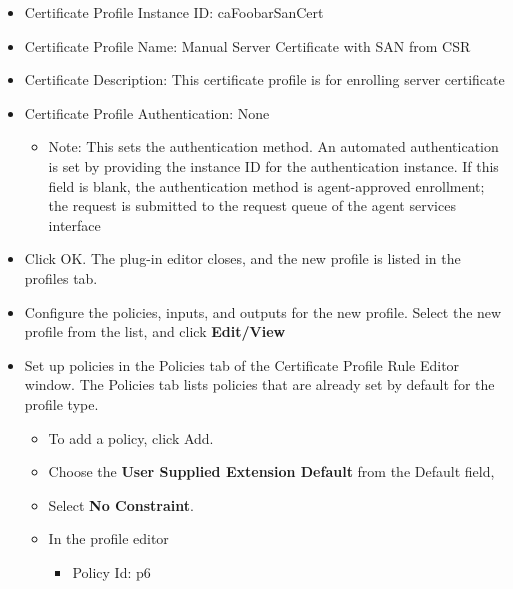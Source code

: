 \documentclass[12pt]{report}
\begin{document}
\begin{enumerate}[label*=\arabic*.]
\begin{enumerate}[label*=\arabic*.]
                    \begin{itemize}
                        \item Certificate Profile Instance ID: caFoobarSanCert
                        \item Certificate Profile Name: Manual Server Certificate with SAN from CSR
                        \item Certificate Description: This certificate profile is for enrolling server certificate
                        \item Certificate Profile Authentication: None 
                            \begin{itemize}
                                \item Note: This sets the authentication method. An automated authentication is set by providing the 
                                instance ID for the authentication instance. If this field is blank, the authentication method 
                                is agent-approved enrollment; the request is submitted to the request queue of the agent services 
                                interface
                            \end{itemize}
                        \item Click OK. The plug-in editor closes, and the new profile is listed in the profiles tab.
                        \item Configure the policies, inputs, and outputs for the new profile. Select the new profile from the list,
                            and click \textbf{Edit/View}
                        \item Set up policies in the Policies tab of the Certificate Profile Rule Editor window.
                            The Policies tab lists policies that are already set by default for the profile type.
                                \begin{itemize}
                                    \item To add a policy, click Add.
                                    \item Choose the \textbf{User Supplied Extension Default}  from the Default field, 
                                    \item Select \textbf{No Constraint}.
                                    \item In the profile editor 
                                        \begin{itemize}
                                            \item Policy Id: p6

\end{itemize}
\end{itemize}
\end{itemize}
\end{enumerate}
\end{enumerate}
\end{document}
